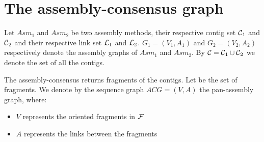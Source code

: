 \section{The assembly-consensus graph}

Let \(Asm_{1}\) and \(Asm_{2}\) be two assembly methods, their respective contig set \(\mathcal{C}{}_{1}\) and \(\mathcal{C}{}_{2}\) and their respective link set \(\mathcal{L}{}_{1}\) and \(\mathcal{L}{}_{2}\).
\(G_{1}= (V_1, A_1)\) and \(G_{2}= (V_2, A_2)\) respectively denote the assembly graphs of \(Asm_{1}\) and \(Asm_{2}\). By \(\mathcal{C}{} = \mathcal{C}{}_1 \cup \mathcal{C}{}_2\) we denote the set of all the contigs.

The assembly-consensus returns fragments of the contigs.
Let \Fragments{} be the set of fragments.
We denote by the sequence graph \(ACG = (V, A)\) the pan-assembly graph, where:
\begin{itemize}
  \item \(V\) represents the oriented fragments in \(\mathcal{F}{}\)
  \item \(A\) represents the links between the fragments
\end{itemize}







